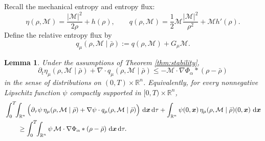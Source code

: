 \documentclass[reqno,11pt]{amsart}
\numberwithin{equation}{section}
\newtheorem{lemma}[theorem]{Lemma}
\theoremstyle{definition}
\def\dd{{\, \rm d}}
\begin{document}
Recall the mechanical entropy and entropy flux:
\[
  \eta(\rho, \mathcal{M})
  = \frac{|\mathcal{M}|^{2}}{2\rho} + h(\rho),
  \qquad
  q(\rho,\mathcal{M})
  =\frac12 \mathcal{M}\frac{|\mathcal{M}|^{2}}{\rho^{2}}+\mathcal{M}h'(\rho).
\]
Define the  relative entropy flux by
\begin{equation}\nonumber
  q_\mu(\rho,\mathcal{M}\mid\bar\rho)
  :=q(\rho,\mathcal{M})+G_\mu\mathcal{M}.
\end{equation}

\begin{lemma}\label{effrelativeei}
Under the assumptions of {\rm Theorem \ref{thm:stability}},
\begin{equation}\label{relativeentropy}
  \partial_t\eta_\mu(\rho,\mathcal{M}\mid\bar\rho)
  +\nabla\cdot q_\mu(\rho,\mathcal{M}\mid\bar\rho)
  \le -\mathcal M\cdot \nabla\Phi_\alpha*(\rho-\bar\rho)
\end{equation}
in the sense of distributions on $(0,T)\times\mathbb R^n$.  Equivalently, for every nonnegative Lipschitz function $\psi$ compactly supported in $[0,T)\times\mathbb R^n$,
\begin{align}\label{testinequality}
&\int_0^T\!\!\int_{\mathbb R^n}
\Big(\partial_\tau\psi\,\eta_\mu(\rho,\mathcal M\mid\bar\rho)
+\nabla\psi\cdot q_\mu(\rho,\mathcal M\mid\bar\rho)\Big)\,\dd\boldsymbol{x}\dd\tau
+\int_{\mathbb R^n}\psi(0,\boldsymbol{x})\,\eta_\mu(\rho,\mathcal M\mid\bar\rho)(0,\boldsymbol{x})\,\dd\boldsymbol{x}
\nonumber\\
&\qquad\ge
\int_0^T\!\!\int_{\mathbb R^n}
\psi\,\mathcal M\cdot\nabla\Phi_\alpha*(\rho-\bar\rho)\,\dd\boldsymbol{x}\dd\tau.
\end{align}
\end{lemma}
\end{document}
